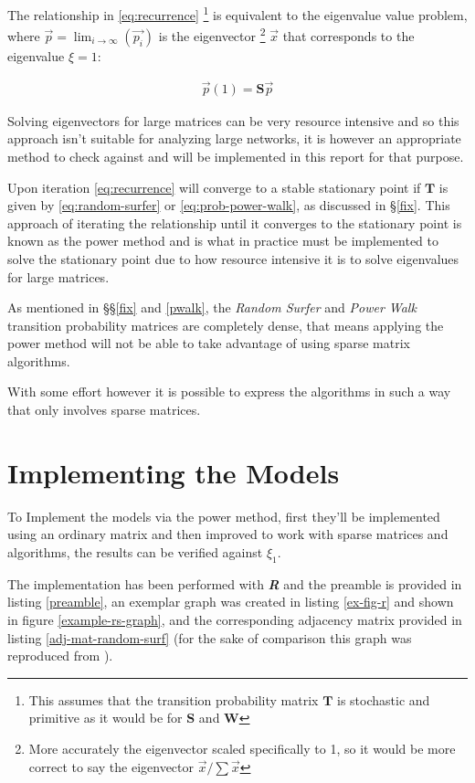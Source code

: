\documentclass[11pt, twoside]{report}
\begin{document}
The relationship in \eqref{eq:recurrence} \footnote{This assumes that the transition probability matrix \(\mathbf{T}\) is stochastic and primitive as it would be for \(\mathbf{S}\)
and \(\mathbf{W}\)} is equivalent to the eigenvalue value problem, where
\(\vec{p} = \lim_{i \rightarrow \infty} \left( \vec{p_{i}}\right)\) is the
eigenvector \footnote{More accurately the eigenvector scaled specifically to 1, so it would be more correct to say the eigenvector \(\vec{x} / \sum \vec{x}\)} \(\vec{x}\) that corresponds to the eigenvalue \(\xi=1\):

\begin{align}
\vec{p} (1) = \mathbf{S} \vec{p} \label{eq:eigenprob}
\end{align}

Solving eigenvectors for large matrices can be very resource intensive and so
this approach isn't suitable for analyzing large networks, it is however an appropriate method to check against and will be implemented in this report for that purpose.

Upon iteration \eqref{eq:recurrence}  will converge to a stable stationary point if \(\mathbf{T}\) is given by \eqref{eq:random-surfer} or \eqref{eq:prob-power-walk}, as discussed
in \S \ref{fix}. This approach of iterating the relationship until it converges to the stationary point is known as the power method
\cite{larsonElementaryLinearAlgebra1991a} and is what in practice must be
implemented to solve the stationary point due to how resource intensive it is to solve eigenvalues for large matrices.

As mentioned in \S\S \ref{fix} and \ref{pwalk}, the \emph{Random Surfer} and \emph{Power Walk}
transition probability matrices are completely dense, that means applying the
power method will not be able to take advantage of using sparse matrix
algorithms.

With some effort however it is possible to express the algorithms in such a way that only involves sparse matrices.

\section{Implementing the Models}
\label{implement_models}


To Implement the models via the power method, first they'll be implemented using
an ordinary matrix and then improved to work with sparse matrices and
algorithms, the results can be verified against \(\xi_{1}\).

The implementation has been performed with \emph{\textbf{R}} and the preamble is
provided in listing \ref{preamble}, an exemplar graph was created in listing \ref{ex-fig-r} and shown in figure \ref{example-rs-graph}, and the corresponding adjacency matrix provided in listing \ref{adj-mat-random-surf} (for the sake of comparison this graph was reproduced from \cite{parkPowerWalkRevisiting2013}).
\end{document}
